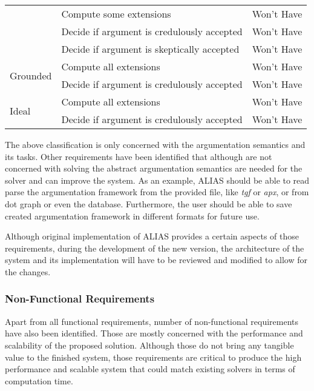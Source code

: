 \begin{table}[]
\begin{tabular}{|l|l|l|}
		& Compute some extensions                          & Won't Have      \\ \cline{2-3} 
		& Decide if argument is credulously accepted & Won't Have      \\ \cline{2-3} 
		& Decide if argument is skeptically accepted & Won't Have      \\ \hline
		\multirow{2}{*}{Grounded}    & Compute all extensions                           & Won't Have      \\ \cline{2-3} 
		& Decide if argument is credulously accepted & Won't Have      \\ \hline
		\multirow{2}{*}{Ideal}       & Compute all extensions                           & Won't Have      \\ \cline{2-3} 
		& Decide if argument is credulously accepted & Won't Have      \\ \hline
	\end{tabular}
\end{table}


The above classification is only concerned with the argumentation semantics and its tasks. Other requirements have been identified that although are not concerned with solving the abstract argumentation semantics are needed for the solver and can improve the system. As an example, ALIAS should be able to read parse the argumentation framework from the provided file, like \textit{tgf} or \textit{apx}, or from dot graph or even the database. Furthermore, the user should be able to save created argumentation framework in different formats for future use. 

Although original implementation of ALIAS provides a certain aspects of those requirements, during the development of the new version, the architecture of the system and its implementation will have to be reviewed and modified to allow for the changes.

\subsubsection{Non-Functional Requirements}
Apart from all functional requirements, number of non-functional requirements have also been identified. Those are mostly concerned with the performance and scalability of the proposed solution. Although those do not bring any tangible value to the finished system, those requirements are critical to produce the high performance and scalable system that could match existing solvers in terms of computation time. 

